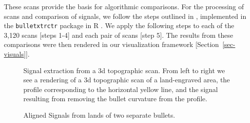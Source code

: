 \documentclass[
  12pt]{article}
\begin{document}
These scans provide the basis for algorithmic comparisons. For the
processing of scans and comparison of signals, we follow the steps
outlined in \citet{hareAutomaticMatchingBullet2017}, implemented in the
\texttt{bulletxtrctr} package in R
\citep{hofmannBulletxtrctrAutomaticMatching2022}. We apply the following
steps to each of the 3,120 scans {[}steps 1-4{]} and each pair of scans
{[}step 5{]}. The results from these comparisons were then rendered in
our visualization framework {[}Section~\ref{sec-visuals}{]}.

\begin{figure}[H]


\caption{\label{fig-extracted-sigs}Signal extraction from a 3d
topographic scan. From left to right we see a rendering of a 3d
topographic scan of a land-engraved area, the profile corresponding to
the horizontal yellow line, and the signal resulting from removing the
bullet curvature from the profile.}

\end{figure}%

\begin{figure}[H]


\caption{\label{fig-aligned-sigs}Aligned Signals from lands of two
separate bullets.}

\end{figure}%
\end{document}
